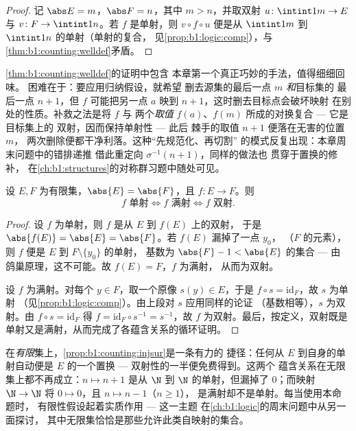 \begin{proof}
记 $\abs E = m$，$\abs F = n$，其中 $m > n$，并取双射
$u \colon \intint1m \to E$ 与 $v \colon F \to \intint1n$。若 $f$
是单射，则 $v \circ f \circ u$ 便是从
$\intint1m$ 到 $\intint1n$ 的单射（单射的复合，
见\cref{prop:b1:logic:comp}），与
\cref{thm:b1:counting:welldef}矛盾。
\end{proof}

\begin{remark}[插曲：定理证明中为何要作交换？]\label{rem:b1:counting:swapinterlude}
\cref{thm:b1:counting:welldef}的证明中包含
本章第一个真正巧妙的手法，值得细细回味。
困难在于：要应用归纳假设，就希望
删去源集的最后一点 $m$ \emph{和}目标集的
最后一点 $n+1$，但 $f$ 可能把另一点 $a$ 映到 $n
+ 1$，这时删去目标点会破坏映射
在别处的性质。补救之法是将 $f$ 与
两个\emph{取值} $f(a)$、$f(m)$ 所成的对换复合 --- 它是目标集上的
双射，因而保持单射性 --- 此后
棘手的取值 $n + 1$ 便落在无害的位置 $m$，
两次删除便都干净利落。这种“先规范化、再切割”
的模式反复出现：本章周末问题中的错排递推
借此重定向 $\sigma^{-1}(n+1)$，同样的做法也
贯穿于置换的修补，
在\cref{ch:b1:structures}的对称群习题中随处可见。
\end{remark}

\begin{proposition}[单射、满射与基数]\label{prop:b1:counting:injsur}
设 $E, F$ 为有限集，$\abs{E} = \abs{F}$，且 $f \colon E
\to F$。则
\[
f \text{ 单射} \iff f \text{ 满射} \iff f \text{ 双射}.
\]
\end{proposition}

\begin{proof}
设 $f$ 为单射，则 $f$ 是从 $E$ 到 $f(E)$ 上的双射，
于是 $\abs{f(E)} = \abs{E} = \abs{F}$。若 $f(E)$ 漏掉了一点 $y_0$，
（$F$ 的元素），则 $f$ 便是 $E$ 到 $F \setminus \{y_0\}$ 的单射，
基数为 $\abs{F} - 1 < \abs{E}$ 的集合 --- 由
鸽巢原理，这不可能。故 $f(E) = F$，$f$ 为满射，
从而为双射。

设 $f$ 为满射。对每个 $y \in F$，取一个原像 $s(y)
\in E$，于是 $f \circ s = \mathrm{id}_F$，故 $s$ 为单射
（见\cref{prop:b1:logic:comp}）。由上段对 $s$ 应用同样的论证
（基数相等），$s$ 为双射。由 $f \circ s =
\mathrm{id}_F$ 得 $f = \mathrm{id}_F \circ s^{-1} = s^{-1}$，故
$f$ 为双射。最后，按定义，双射既是
单射又是满射，从而完成了各蕴含关系的循环证明。
\end{proof}

\begin{example}[有限性至关重要]\label{ex:b1:counting:finiteonly}
在\emph{有限}集上，\cref{prop:b1:counting:injsur}是一条有力的
捷径：任何从 $E$ 到自身的单射自动便是
$E$ 的一个置换 --- 双射性的一半便免费得到。这两个
蕴含关系在无限集上都不再成立：$n \mapsto n + 1$
是从 $\N$ 到 $\N$ 的单射，但漏掉了 $0$；而映射 $\N \to \N$
将 $0 \mapsto 0$，且 $n \mapsto n - 1$（$n \geq 1$），
是满射却不是单射。每当使用本命题时，
有限性假设起着实质作用 --- 这一主题
在\cref{ch:b1:logic}的周末问题中从另一面探讨，
其中无限集恰恰是那些允许此类自映射的集合。
\end{example}


